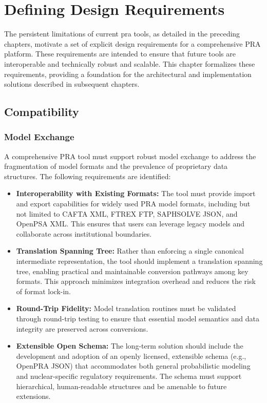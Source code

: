 \chapter{Defining Design Requirements}
\label{ch:design-requirements}

The persistent limitations of current \acrshort{pra} tools, as detailed in the preceding chapters, motivate a set of explicit design requirements for a comprehensive PRA platform. These requirements are intended to ensure that future tools are interoperable and technically robust and scalable. This chapter formalizes these requirements, providing a foundation for the architectural and implementation solutions described in subsequent chapters.

\section{Compatibility}
\label{sec:compatibility}

\subsection{Model Exchange}
\label{subsec:model-exchange}

A comprehensive PRA tool must support robust model exchange to address the fragmentation of model formats and the prevalence of proprietary data structures. The following requirements are identified:

\begin{itemize}
    \item \textbf{Interoperability with Existing Formats:} The tool must provide import and export capabilities for widely used PRA model formats, including but not limited to CAFTA XML, FTREX FTP, SAPHSOLVE JSON, and OpenPSA XML. This ensures that users can leverage legacy models and collaborate across institutional boundaries.
    \item \textbf{Translation Spanning Tree:} Rather than enforcing a single canonical intermediate representation, the tool should implement a translation spanning tree, enabling practical and maintainable conversion pathways among key formats. This approach minimizes integration overhead and reduces the risk of format lock-in.
    \item \textbf{Round-Trip Fidelity:} Model translation routines must be validated through round-trip testing to ensure that essential model semantics and data integrity are preserved across conversions.
    \item \textbf{Extensible Open Schema:} The long-term solution should include the development and adoption of an openly licensed, extensible schema (e.g., OpenPRA JSON) that accommodates both general probabilistic modeling and nuclear-specific regulatory requirements. The schema must support hierarchical, human-readable structures and be amenable to future extensions.
\end{itemize}

